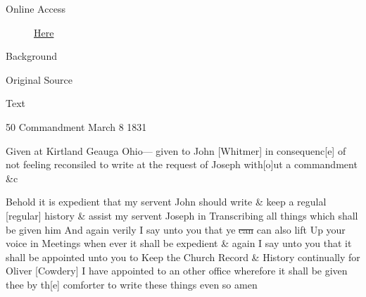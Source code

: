 			\begin{description}
				\item[Online Access] \href{https://www.josephsmithpapers.org/paper-summary/revelation-circa-8-march-1831-b-dc-47/1}{Here}
			\end{description}
			
			\begin{description}
				\item[Background]
			\end{description}
			
			
			\begin{description}
				\item[Original Source]
			\end{description}
			
			
			\begin{description}
				\item[Text]
			\end{description}
			
				\begin{tightcenter}
				50 Commandment March 8 1831
				\end{tightcenter}
				
				Given at Kirtland Geauga Ohio--- given to John [Whitmer] in consequenc[e] of not feeling reconsiled to write at the request of Joseph with[o]ut a commandment \&c
				
				Behold it is expedient that my servent John should write \& keep a regulal [regular] history \& assist my servent Joseph in Transcribing all things which shall be given him And again verily I say unto you that ye \sout{can} can also lift Up your voice in Meetings when ever it shall be expedient \& again I say unto you that it shall be appointed unto you to Keep the Church Record \& History continually for Oliver [Cowdery] I have appointed to an other office wherefore it shall be given thee by th[e] comforter to write these things even so amen
				
